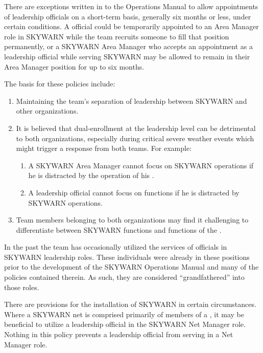\documentclass[pdflatex,letterpaper,twoside,12pt]{book}
\begin{document}
There are exceptions written in to the Operations Manual to allow appointments of \tpteam leadership officials on a short-term basis, generally six months or less, under certain conditions.  A \tpteam official could be temporarily appointed to an Area Manager role in SKYWARN while the team recruits someone to fill that position permanently, or a SKYWARN Area Manager who accepts an appointment as a \tpteam leadership official while serving SKYWARN may be allowed to remain in their Area Manager position for up to six months.

The basis for these policies include:

\begin{enumerate}
\item Maintaining the team's separation of leadership between SKYWARN and other organizations.
\item It is believed that dual-enrollment at the leadership level can be detrimental to both organizations, especially during critical severe weather events which might trigger a response from both teams.  For example:
\begin{enumerate}
\item A SKYWARN Area Manager cannot focus on SKYWARN operations if he is distracted by the operation of his \tpteam.
\item A \tpteam leadership official cannot focus on \tpteam functions if he is distracted by SKYWARN operations.
\end{enumerate}
\item Team members belonging to both organizations may find it challenging to differentiate between SKYWARN functions and functions of the \tpteam.
\end{enumerate}

In the past the team has occasionally utilized the services of \tpteam officials in SKYWARN leadership roles.  These individuals were already in these positions prior to the development of the SKYWARN Operations Manual and many of the policies contained therein.  As such, they are considered ``grandfathered'' into those roles.

There are provisions for the installation of SKYWARN  in certain circumstances.  Where a SKYWARN net is comprised primarily of members of a \tpteam, it may be beneficial to utilize a \tpteam leadership official in the SKYWARN Net Manager role.  Nothing in this policy prevents a \tpteam leadership official from serving in a Net Manager role.

\end{document}
